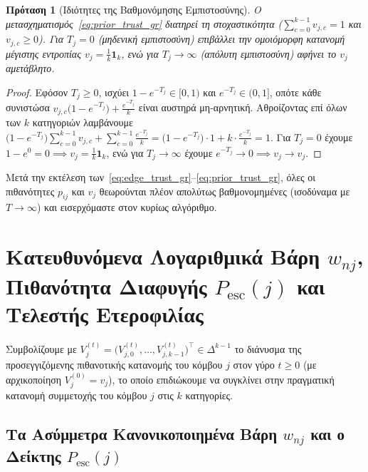 \documentclass[11pt, a4paper]{article}
\newtheorem{proposition}{Πρόταση}
\theoremstyle{definition}
\theoremstyle{definition}
\begin{document}
\begin{proposition}[Ιδιότητες της Βαθμονόμησης Εμπιστοσύνης]\label{prop:trust_gr}
Ο μετασχηματισμός~\eqref{eq:prior_trust_gr} διατηρεί τη στοχαστικότητα ($\sum_{c=0}^{k-1} v_{j,c} = 1$ και $v_{j,c} \ge 0$). Για $T_j = 0$ (μηδενική εμπιστοσύνη) επιβάλλει την ομοιόμορφη κατανομή μέγιστης εντροπίας $v_j = \frac{1}{k}\mathbf{1}_k$, ενώ για $T_j \to \infty$ (απόλυτη εμπιστοσύνη) αφήνει το $v_j$ αμετάβλητο.
\end{proposition}

\begin{proof}
Εφόσον $T_j \ge 0$, ισχύει $1 - e^{-T_j} \in [0, 1)$ και $e^{-T_j} \in (0, 1]$, οπότε κάθε συνιστώσα $v_{j,c}\big(1 - e^{-T_j}\big) + \frac{e^{-T_j}}{k}$ είναι αυστηρά μη-αρνητική. Αθροίζοντας επί όλων των $k$ κατηγοριών λαμβάνουμε $\big(1 - e^{-T_j}\big)\sum_{c=0}^{k-1} v_{j,c} + \sum_{c=0}^{k-1}\frac{e^{-T_j}}{k} = \big(1 - e^{-T_j}\big)\cdot 1 + k \cdot \frac{e^{-T_j}}{k} = 1$. Για $T_j = 0$ έχουμε $1 - e^0 = 0 \implies v_j = \frac{1}{k}\mathbf{1}_k$, ενώ για $T_j \to \infty$ έχουμε $e^{-T_j} \to 0 \implies v_j \to v_j$.
\end{proof}

Μετά την εκτέλεση των~\eqref{eq:edge_trust_gr}--\eqref{eq:prior_trust_gr}, όλες οι πιθανότητες $p_{ij}$ και $v_j$ θεωρούνται πλέον απολύτως βαθμονομημένες (ισοδύναμα με $T \to \infty$) και εισερχόμαστε στον κυρίως αλγόριθμο.

\section{Κατευθυνόμενα Λογαριθμικά Βάρη \texorpdfstring{$w_{nj}$}{w\_nj}, Πιθανότητα Διαφυγής \texorpdfstring{$P_{\mathrm{esc}}(j)$}{P\_esc(j)} και Τελεστής Ετεροφιλίας}

Συμβολίζουμε με $V_j^{(t)} = \big(V_{j,0}^{(t)}, \dots, V_{j,k-1}^{(t)}\big)^\top \in \Delta^{k-1}$ το διάνυσμα της προσεγγιζόμενης πιθανοτικής κατανομής του κόμβου $j$ στον γύρο $t \ge 0$ (με αρχικοποίηση $V_j^{(0)} = v_j$), το οποίο επιδιώκουμε να συγκλίνει στην πραγματική κατανομή συμμετοχής του κόμβου $j$ στις $k$ κατηγορίες.

\subsection{Τα Ασύμμετρα Κανονικοποιημένα Βάρη \texorpdfstring{$w_{nj}$}{w\_nj} και ο Δείκτης \texorpdfstring{$P_{\mathrm{esc}}(j)$}{P\_esc(j)}}
\end{document}
